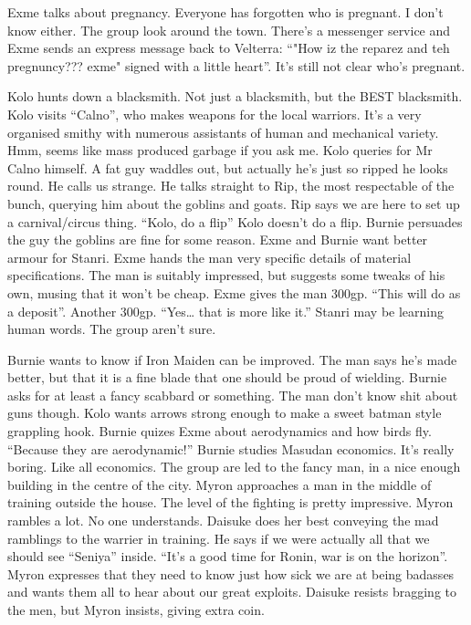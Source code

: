 \begin{multicols}{2}
Exme talks about pregnancy. Everyone has forgotten who is pregnant. I don’t know either. The group look around the town. There’s a messenger service and Exme sends an express message back to Velterra: “"How iz the reparez and teh pregnuncy??? exme" signed with a little heart”. It’s still not clear who’s pregnant.\medskip

Kolo hunts down a blacksmith. Not just a blacksmith, but the BEST blacksmith. Kolo visits “Calno”, who makes weapons for the local warriors. It’s a very organised smithy with numerous assistants of human and mechanical variety. Hmm, seems like mass produced garbage if you ask me. Kolo queries for Mr Calno himself. A fat guy waddles out, but actually he’s just so ripped he looks round. He calls us strange. He talks straight to Rip, the most respectable of the bunch, querying him about the goblins and goats. Rip says we are here to set up a carnival/circus thing. “Kolo, do a flip” Kolo doesn’t do a flip. Burnie persuades the guy the goblins are fine for some reason. Exme and Burnie want better armour for Stanri. Exme hands the man very specific details of material specifications. The man is suitably impressed, but suggests some tweaks of his own, musing that it won’t be cheap. Exme gives the man 300gp. “This will do as a deposit”. Another 300gp. “Yes… that is more like it.” Stanri may be learning human words. The group aren’t sure.\medskip

Burnie wants to know if Iron Maiden can be improved. The man says he’s made better, but that it is a fine blade that one should be proud of wielding. Burnie asks for at least a fancy scabbard or something. The man don’t know shit about guns though. Kolo wants arrows strong enough to make a sweet batman style grappling hook. Burnie quizes Exme about aerodynamics and how birds fly. “Because they are aerodynamic!” Burnie studies Masudan economics. It’s really boring. Like all economics. The group are led to the fancy man, in a nice enough building in the centre of the city. Myron approaches a man in the middle of training outside the house. The level of the fighting is pretty impressive. Myron rambles a lot. No one understands. Daisuke does her best conveying the mad ramblings to the warrier in training. He says if we were actually all that we should see “Seniya” inside. “It’s a good time for Ronin, war is on the horizon”. Myron expresses that they need to know just how sick we are at being badasses and wants them all to hear about our great exploits. Daisuke resists bragging to the men, but Myron insists, giving extra coin.\medskip


\end{multicols}
